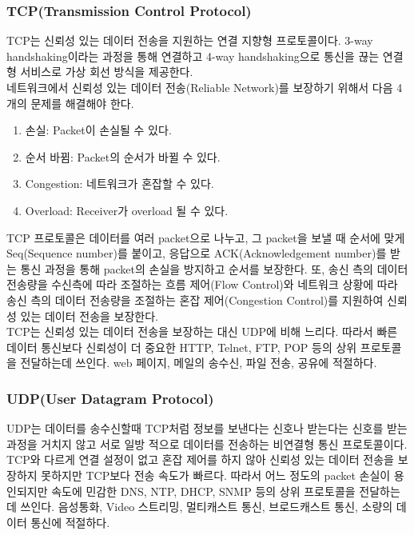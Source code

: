 \begin{multicols}{2}
    \subsubsection*{TCP(Transmission Control Protocol)}
    TCP는 신뢰성 있는 데이터 전송을 지원하는 연결 지향형 프로토콜이다. 3-way handshaking이라는 과정을 통해 연결하고 4-way handshaking으로 통신을 끊는 연결형 서비스로 가상 회선 방식을 제공한다. \\
    네트워크에서 신뢰성 있는 데이터 전송(Reliable Network)를 보장하기 위해서 다음 4개의 문제를 해결해야 한다.
    \begin{enumerate}
        \item 손실: Packet이 손실될 수 있다.    \vspace{-1mm}
        \item 순서 바뀜: Packet의 순서가 바뀔 수 있다. \vspace{-1mm}
        \item Congestion: 네트워크가 혼잡할 수 있다. \vspace{-1mm}
        \item Overload: Receiver가 overload 될 수 있다. \vspace{-1mm}
    \end{enumerate}
    TCP 프로토콜은 데이터를 여러 packet으로 나누고, 그 packet을 보낼 때 순서에 맞게 Seq(Sequence number)를 붙이고, 응답으로 ACK(Acknowledgement number)를 받는 통신 과정을 통해 packet의 손실을 방지하고 순서를 보장한다. 또, 송신 측의 데이터 전송량을 수신측에 따라 조절하는 흐름 제어(Flow Control)와 네트워크 상황에 따라 송신 측의 데이터 전송량을 조절하는 혼잡 제어(Congestion Control)를 지원하여 신뢰성 있는 데이터 전송을 보장한다. \\
    TCP는 신뢰성 있는 데이터 전송을 보장하는 대신 UDP에 비해 느리다. 따라서 빠른 데이터 통신보다 신뢰성이 더 중요한 HTTP, Telnet, FTP, POP 등의 상위 프로토콜을 전달하는데 쓰인다. web 페이지, 메일의 송수신, 파일 전송, 공유에 적절하다.
    
    \subsubsection*{UDP(User Datagram Protocol)}
    UDP는 데이터를 송수신할때 TCP처럼 정보를 보낸다는 신호나 받는다는 신호를 받는 과정을 거치지 않고 서로 일방
    적으로 데이터를 전송하는 비연결형 통신 프로토콜이다. TCP와 다르게 연결 설정이 없고 혼잡 제어를 하지 않아 신뢰성 있는 데이터 전송을 보장하지 못하지만 TCP보다 전송 속도가 빠르다. 따라서 어느 정도의 packet 손실이 용인되지만 속도에 민감한 DNS, NTP, DHCP, SNMP 등의 상위 프로토콜을 전달하는데 쓰인다. 음성통화, Video 스트리밍, 멀티캐스트 통신, 브로드캐스트 통신, 소량의 데이터 통신에 적절하다.

\end{multicols}
